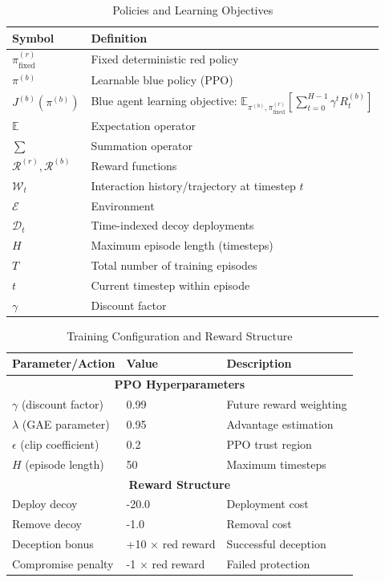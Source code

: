 \documentclass[12pt,oneside]{article}
\begin{document}
\begin{table}[H]
\centering
\caption{Policies and Learning Objectives}
\label{tab:policy_symbols}
\small
\begin{tabular}{|l|p{7cm}|}
\hline
\rowcolor{cwBorder!30} \textbf{Symbol} & \textbf{Definition} \\
\hline
$\pi^{(r)}_{\text{fixed}}$ & Fixed deterministic red policy \\
$\pi^{(b)}$ & Learnable blue policy (PPO) \\
$J^{(b)}(\pi^{(b)})$ & Blue agent learning objective: $\mathbb{E}_{\pi^{(b)}, \pi^{(r)}_{\text{fixed}}}\left[\sum_{t=0}^{H-1} \gamma^t R_t^{(b)}\right]$ \\
$\mathbb{E}$ & Expectation operator \\
$\sum$ & Summation operator \\
$\mathcal{R}^{(r)}, \mathcal{R}^{(b)}$ & Reward functions \\
$\mathcal{W}_t$ & Interaction history/trajectory at timestep $t$ \\
$\mathcal{E}$ & Environment \\
$\mathcal{D}_t$ & Time-indexed decoy deployments \\
$H$ & Maximum episode length (timesteps) \\
$T$ & Total number of training episodes \\
$t$ & Current timestep within episode \\
$\gamma$ & Discount factor \\
\hline
\end{tabular}
\end{table}

\begin{table}[H]
\centering
\caption{Training Configuration and Reward Structure}
\label{tab:training_config}
\small
\begin{tabular}{|l|l|p{4.5cm}|}
\hline
\rowcolor{cwBorder!30} \textbf{Parameter/Action} & \textbf{Value} & \textbf{Description} \\
\hline
\multicolumn{3}{|c|}{\textbf{PPO Hyperparameters}} \\
\hline
$\gamma$ (discount factor) & 0.99 & Future reward weighting \\
$\lambda$ (GAE parameter) & 0.95 & Advantage estimation \\
$\epsilon$ (clip coefficient) & 0.2 & PPO trust region \\
$H$ (episode length) & 50 & Maximum timesteps \\
\hline
\multicolumn{3}{|c|}{\textbf{Reward Structure}} \\
\hline
Deploy decoy & -20.0 & Deployment cost \\
Remove decoy & -1.0 & Removal cost \\
Deception bonus & +10 × red reward & Successful deception \\
Compromise penalty & -1 × red reward & Failed protection \\
\hline
\end{tabular}
\end{table}
\end{document}
